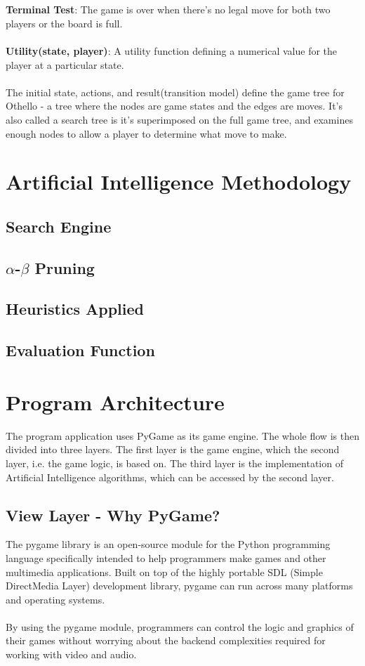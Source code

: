 \documentclass[letterpaper,12pt]{article}
\begin{document}
\\\\
\textbf{Terminal Test}: The game is over when there's no legal move for both two players or the board is full.
\\\\
\textbf{Utility(state, player)}: A utility function defining a numerical value for the player at a particular state.
\\\\
The initial state, actions, and result(transition model) define the game tree for Othello - a tree where the nodes are game states and the edges are moves. It's also called a search tree is it's superimposed on the full game tree, and examines enough nodes to allow a player to determine what move to make.


\section{Artificial Intelligence Methodology}
\subsection{Search Engine}
\subsection{$\alpha$-$\beta$ Pruning}
\subsection{Heuristics Applied}
\subsection{Evaluation Function}


\section{Program Architecture}

The program application uses PyGame as its game engine. The whole flow is then divided into three layers. The first layer is the game engine, which the second layer, i.e. the game logic, is based on. The third layer is the implementation of Artificial Intelligence algorithms, which can be accessed by the second layer.

\subsection{View Layer - Why PyGame?}
The pygame library is an open-source module for the Python programming language specifically intended to help programmers make games and other multimedia applications. Built on top of the highly portable SDL (Simple DirectMedia Layer) development library, pygame can run across many platforms and operating systems.\\\\
\noindent
By using the pygame module, programmers can control the logic and graphics of their games without worrying about the backend complexities required for working with video and audio.
\end{document}
